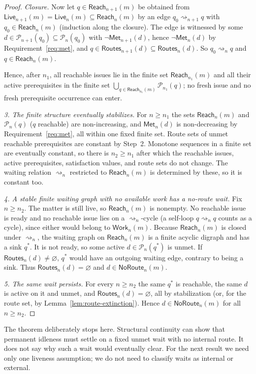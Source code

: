 \documentclass[11pt]{article}
\theoremstyle{definition}
\theoremstyle{remark}
\newcommand{\Met}{\mathsf{Met}}
\newcommand{\Pre}{\mathcal P}
\newcommand{\Live}{\mathsf{Live}}
\newcommand{\Routes}{\mathsf{Routes}}
\newcommand{\Reach}{\mathsf{Reach}}
\newcommand{\Work}{\mathsf{Work}}
\newcommand{\NoRoute}{\mathsf{NoRoute}}
\begin{document}
\begin{proof}
\emph{Closure.} Now let $q\in\Reach_{n+1}(m)$ be obtained from
$\Live_{n+1}(m)=\Live_n(m)\subseteq\Reach_n(m)$ by an edge
$q_0\rightsquigarrow_{n+1}q$ with $q_0\in\Reach_n(m)$ (induction along the
closure). The edge is witnessed by some $d\in\Pre_{n+1}(q_0)\subseteq\Pre_n(q_0)$
with $\neg\Met_{n+1}(d)$, hence $\neg\Met_n(d)$ by
Requirement~\ref{req:met}, and $q\in\Routes_{n+1}(d)\subseteq\Routes_n(d)$.
So $q_0\rightsquigarrow_n q$ and $q\in\Reach_n(m)$.

Hence, after $n_1$, all reachable issues lie in the finite set
$\Reach_{n_1}(m)$ and all their active prerequisites in the finite set
$\bigcup_{q\in\Reach_{n_1}(m)}\Pre_{n_1}(q)$; no fresh issue and no fresh
prerequisite occurrence can enter.

\emph{3. The finite structure eventually stabilizes.}
For $n\ge n_1$ the sets $\Reach_n(m)$ and $\Pre_n(q)$ ($q$ reachable) are
non-increasing, and $\Met_n(d)$ is non-decreasing by Requirement~\ref{req:met},
all within one fixed finite set. Route sets of unmet reachable prerequisites
are constant by Step~2. Monotone sequences in a finite set are eventually
constant, so there is $n_2\ge n_1$ after which the reachable issues, active
prerequisites, satisfaction values, and route sets do not change. The waiting
relation $\rightsquigarrow_n$ restricted to $\Reach_n(m)$ is determined by
these, so it is constant too.

\emph{4. A stable finite waiting graph with no available work has a no-route
wait.}
Fix $n\ge n_2$. The matter is still live, so $\Reach_n(m)$ is nonempty. No
reachable issue is ready and no reachable issue lies on a
$\rightsquigarrow_n$-cycle (a self-loop $q\rightsquigarrow_n q$ counts as a
cycle), since either would belong to $\Work_n(m)$. Because $\Reach_n(m)$ is
closed under $\rightsquigarrow_n$, the waiting graph on $\Reach_n(m)$ is a
finite acyclic digraph and has a sink $q^*$. It is not ready, so some active
$d\in\Pre_n(q^*)$ is unmet. If $\Routes_n(d)\neq\varnothing$, $q^*$ would have
an outgoing waiting edge, contrary to being a sink. Thus
$\Routes_n(d)=\varnothing$ and $d\in\NoRoute_n(m)$.

\emph{5. The same wait persists.}
For every $n\ge n_2$ the same $q^*$ is reachable, the same $d$ is active on it
and unmet, and $\Routes_n(d)=\varnothing$, all by stabilization (or, for the
route set, by Lemma~\ref{lem:route-extinction}). Hence $d\in\NoRoute_n(m)$ for
all $n\ge n_2$.
\end{proof}

The theorem deliberately stops here. Structural continuity can show that
permanent idleness must settle on a fixed unmet wait with no internal route. It
does not say why such a wait would eventually clear. For the next result we
need only one liveness assumption; we do not need to classify waits as
internal or external.
\end{document}

